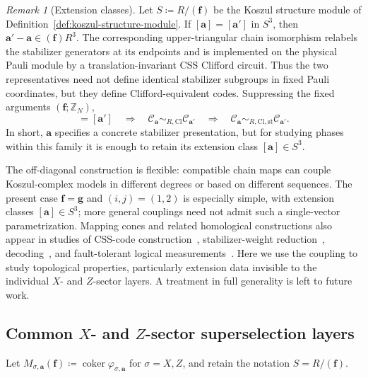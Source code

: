\documentclass[aps,prx,english,superscriptaddress,twocolumn,tightenlines,showpacs,longbibliography,floatfix,amsfonts]{revtex4-2}
\theoremstyle{remark}
\newtheorem{remark}{Remark}
\theoremstyle{definition}
\begin{document}
\begin{remark}[Extension classes]
	Let \(S\coloneqq R/(\mathbf f)\) be the Koszul structure module of
	Definition~\ref{def:koszul-structure-module}.  If
	\([\mathbf a]=[\mathbf a'] \) in \( S^3\), then
	\(\mathbf a'-\mathbf a\in(\mathbf f)R^3\).  The corresponding
	upper-triangular chain isomorphism relabels the stabilizer generators at its
	endpoints and is implemented on the physical Pauli module by a
	translation-invariant CSS Clifford circuit.  Thus the two representatives
	need not define identical stabilizer subgroups in fixed Pauli coordinates,
	but they define Clifford-equivalent codes.  Suppressing the fixed arguments
	\((\mathbf f;\mathbb Z_N)\),
	\begin{equation}
		[\mathbf a]=[\mathbf a']
		\quad\Longrightarrow\quad
		\mathcal C_{\mathbf a}\sim_{R,\mathrm{Cl}}\mathcal C_{\mathbf a'}
		\quad\Longrightarrow\quad
		\mathcal C_{\mathbf a}\sim_{R,\mathrm{Cl},\mathrm{st}}\mathcal C_{\mathbf a'}.
	\end{equation}
	In short, \(\mathbf a\) specifies a concrete stabilizer presentation, but for
	studying phases within this family it is enough to retain its extension class
	\([\mathbf a]\in S^3\).
\end{remark}

The off-diagonal construction is flexible: compatible chain maps can couple
Koszul-complex models in different degrees or based on different sequences.
The present case \(\mathbf f=\mathbf g\) and \((i,j)=(1,2)\) is especially
simple, with extension classes \([\mathbf a]\in S^3\); more general couplings
need not admit such a single-vector parametrization.  Mapping cones and related
homological constructions also appear in studies of CSS-code
construction~\cite{Audoux2014}, stabilizer-weight
reduction~\cite{Hastings2021WeightReduction,Sabo2024WeightReduction},
decoding~\cite{Kubica2022SingleShot}, and fault-tolerant logical
measurements~\cite{Ide2025HomologicalMeasurement}.  Here we use the coupling to
study topological properties, particularly extension data invisible to the
individual \(X\)- and \(Z\)-sector layers.  A treatment in full generality is
left to future work.

\subsection{Common \(X\)- and \(Z\)-sector superselection layers}

Let
\(M_{\sigma,\mathbf a}(\mathbf f)\coloneqq
\operatorname{coker}\varphi_{\sigma,\mathbf a}\) for \(\sigma=X,Z\), and
retain the notation
\(S=R/(\mathbf f)\).
\end{document}

